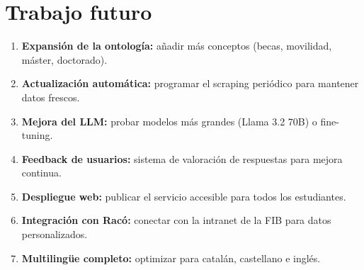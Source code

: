 \documentclass[12pt, a4paper, twoside]{report}
\begin{document}
\section{Trabajo futuro}

\begin{enumerate}
  \item \textbf{Expansi\'on de la ontolog\'ia:} a\~nadir m\'as conceptos (becas, movilidad, m\'aster, doctorado).
  \item \textbf{Actualizaci\'on autom\'atica:} programar el scraping peri\'odico para mantener datos frescos.
  \item \textbf{Mejora del LLM:} probar modelos m\'as grandes (Llama 3.2 70B) o fine-tuning.
  \item \textbf{Feedback de usuarios:} sistema de valoraci\'on de respuestas para mejora continua.
  \item \textbf{Despliegue web:} publicar el servicio accesible para todos los estudiantes.
  \item \textbf{Integraci\'on con Rac\'o:} conectar con la intranet de la FIB para datos personalizados.
  \item \textbf{Multiling\"ue completo:} optimizar para catal\'an, castellano e ingl\'es.
\end{enumerate}
\end{document}

